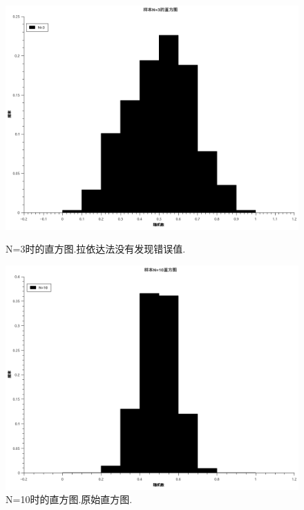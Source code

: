 \documentclass[10pt,a4paper]{article}
\begin{document}
\begin{figure}[H]
\begin{minipage}[b]{0.5\linewidth}
\centering
\includegraphics[width=\textwidth]{../result/Table1.png}
\caption{N=3时的直方图.拉依达法没有发现错误值.}
\label{fig:1}
\end{minipage}
\begin{minipage}[b]{0.5\linewidth}
\centering
\includegraphics[width=\textwidth]{../result/Table2.png}
\caption{N=10时的直方图.原始直方图.}
\label{fig:2}
\end{minipage}
\begin{minipage}[b]{0.5\linewidth}
\centering

\end{minipage}
\end{figure}
\end{document}

